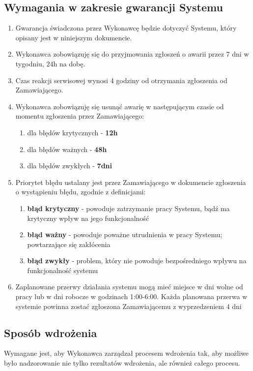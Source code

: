 \documentclass{article}
\begin{document}
\subsection{Wymagania w zakresie gwarancji Systemu}
\begin{enumerate}
	\item Gwarancja świadczona przez Wykonawcę będzie dotyczyć Systemu, który opisany jest w niniejszym dokumencie.
	\item Wykonawca zobowiązuję się do przyjmowania zgłoszeń o awarii przez 7 dni w tygodniu, 24h na dobę.
	\item Czas reakcji serwisowej wynosi 4 godziny od otrzymania zgłoszenia od Zamawiającego.
	\item Wykonawca zobowiązuję się usunąć awarię w następującym czasie od momentu zgłoszenia przez Zamawiającego:
	\begin{enumerate}
		\item dla błędów krytycznych - \textbf{12h}
		\item dla błędów ważnych - \textbf{48h}
		\item dla błędów zwykłych - \textbf{7dni}
	\end{enumerate}

	\item Priorytet błędu ustalany jest przez Zamawiającego w dokumencie zgłoszenia o wystąpieniu błędu, zgodnie z definicjami:
	\begin{enumerate}
		\item \textbf{błąd krytyczny} - powoduje zatrzymanie pracy Systemu, bądź ma krytyczny wpływ na jego funkcjonalność
		\item \textbf{błąd ważny} - powoduje poważne utrudnienia w pracy Systemu; powtarzające się zakłócenia
		\item \textbf{błąd zwykły} - problem, który nie powoduje bezpośredniego wpływu na funkcjonalność systemu
	\end{enumerate}

	\item Zaplanowane przerwy działania systemu mogą mieć miejsce w dni wolne od pracy lub w dni robocze w godzinach 1:00-6:00. Każda planowana przerwa w systemie powinna zostać zgłoszona Zamawiającemu z wyprzedzeniem 4 dni

\end{enumerate}
\subsection{Sposób wdrożenia}
Wymagane jest, aby Wykonawca zarządzał procesem wdrożenia tak, aby możliwe było nadzorowanie nie tylko rezultatów wdrożenia, ale również całego procesu.
\end{document}
